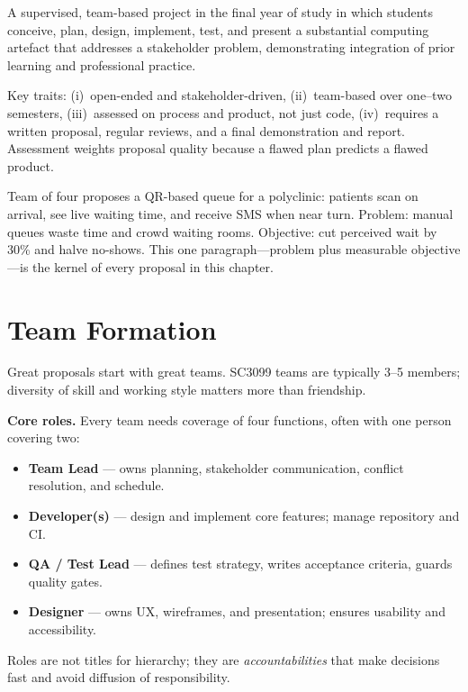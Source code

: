 \begin{definition}
A supervised, team-based project in the final year of study in which students conceive, plan, design, implement, test, and present a substantial computing artefact that addresses a stakeholder problem, demonstrating integration of prior learning and professional practice.
\end{definition}

Key traits: (i)~open-ended and stakeholder-driven, (ii)~team-based over one--two semesters, (iii)~assessed on process and product, not just code, (iv)~requires a written proposal, regular reviews, and a final demonstration and report. Assessment weights proposal quality because a flawed plan predicts a flawed product.

\begin{example}
Team of four proposes a QR-based queue for a polyclinic: patients scan on arrival, see live waiting time, and receive SMS when near turn. Problem: manual queues waste time and crowd waiting rooms. Objective: cut perceived wait by 30\% and halve no-shows. This one paragraph---problem plus measurable objective---is the kernel of every proposal in this chapter.
\end{example}

\section{Team Formation}
\label{sec:team-formation}

Great proposals start with great teams. SC3099 teams are typically 3--5 members; diversity of skill and working style matters more than friendship.

\textbf{Core roles.} Every team needs coverage of four functions, often with one person covering two:
\begin{itemize}
    \item \textbf{Team Lead} --- owns planning, stakeholder communication, conflict resolution, and schedule.
    \item \textbf{Developer(s)} --- design and implement core features; manage repository and CI.
    \item \textbf{QA / Test Lead} --- defines test strategy, writes acceptance criteria, guards quality gates.
    \item \textbf{Designer} --- owns UX, wireframes, and presentation; ensures usability and accessibility.
\end{itemize}
Roles are not titles for hierarchy; they are \emph{accountabilities} that make decisions fast and avoid diffusion of responsibility.

